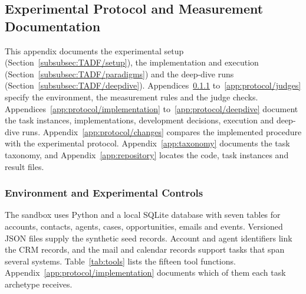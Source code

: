 \subsection{Experimental Protocol and Measurement Documentation}
\label{app:protocol}

This appendix documents the experimental setup (Section~\ref{subsubsec:TADF/setup}), the implementation and execution (Section~\ref{subsubsec:TADF/paradigms}) and the deep-dive runs (Section~\ref{subsubsec:TADF/deepdive}). Appendices~\ref{app:protocol/environment} to~\ref{app:protocol/judges} specify the environment, the measurement rules and the judge checks. Appendices~\ref{app:protocol/implementation} to~\ref{app:protocol/deepdive} document the task instances, implementations, development decisions, execution and deep-dive runs. Appendix~\ref{app:protocol/changes} compares the implemented procedure with the experimental protocol. Appendix~\ref{app:taxonomy} documents the task taxonomy, and Appendix~\ref{app:repository} locates the code, task instances and result files.

\subsubsection{Environment and Experimental Controls}
\label{app:protocol/environment}

The sandbox uses Python and a local SQLite database with seven tables for accounts, contacts, agents, cases, opportunities, emails and events. Versioned JSON files supply the synthetic seed records. Account and agent identifiers link the CRM records, and the mail and calendar records support tasks that span several systems. Table~\ref{tab:tools} lists the fifteen tool functions. Appendix~\ref{app:protocol/implementation} documents which of them each task archetype receives.

